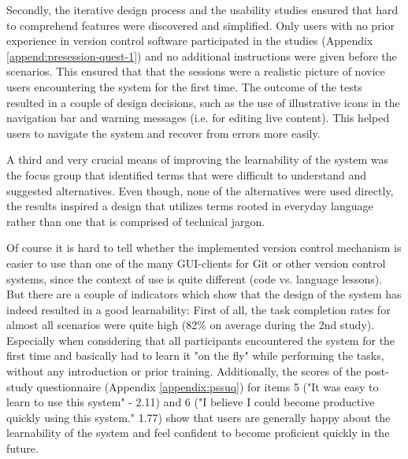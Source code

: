 Secondly, the iterative design process and the usability studies ensured that hard to comprehend features were discovered and simplified. Only users with no prior experience in version control software participated in the studies (Appendix \ref{append:presession-quest-1}) and no additional instructions were given before the scenarios. This ensured that that the sessions were a realistic picture of novice users encountering the system for the first time. The outcome of the tests resulted in a couple of design decisions, such as the use of illustrative icons in the navigation bar and warning messages (i.e. for editing live content). This helped users to navigate the system and recover from errors more easily.

A third and very crucial means of improving the learnability of the system was the focus group that identified terms that were difficult to understand and suggested alternatives. Even though, none of the alternatives were used directly, the results inspired a design that utilizes terms rooted in everyday language rather than one that is comprised of technical jargon.

Of course it is hard to tell whether the implemented version control mechanism is easier to use than one of the many GUI-clients for Git or other version control systems, since the context of use is quite different (code vs. language lessons). But there are a couple of indicators which show that the design of the system has indeed resulted in a good learnability: First of all, the task completion rates for almost all scenarios were quite high (82\% on average during the 2nd study). Especially when considering that all participants encountered the system for the first time and basically had to learn it "on the fly" while performing the tasks, without any introduction or prior training. Additionally, the scores of the post-study questionnaire (Appendix \ref{appendix:pssuq}) for items 5 ("It was easy to learn to use this system" - 2.11) and 6 ("I believe I could become productive quickly using this system." 1.77) show that users are generally happy about the learnability of the system and feel confident to become proficient quickly in the future.




